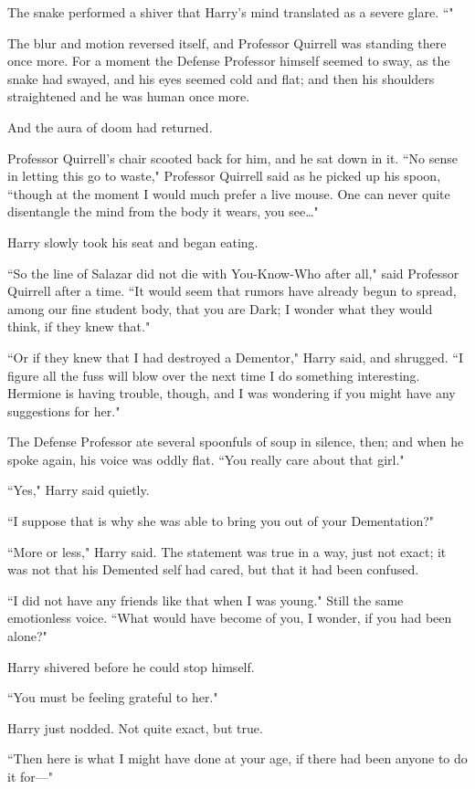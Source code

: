 The snake performed a shiver that Harry's mind translated as a severe glare. ``"

The blur and motion reversed itself, and Professor Quirrell was standing there once more. For a moment the Defense Professor himself seemed to sway, as the snake had swayed, and his eyes seemed cold and flat; and then his shoulders straightened and he was human once more.

And the aura of doom had returned.

Professor Quirrell's chair scooted back for him, and he sat down in it. ``No sense in letting this go to waste," Professor Quirrell said as he picked up his spoon, ``though at the moment I would much prefer a live mouse. One can never quite disentangle the mind from the body it wears, you see{\ldots}"

Harry slowly took his seat and began eating.

\later

``So the line of Salazar did not die with You-Know-Who after all," said Professor Quirrell after a time. ``It would seem that rumors have already begun to spread, among our fine student body, that you are Dark; I wonder what they would think, if they knew that."

``Or if they knew that I had destroyed a Dementor," Harry said, and shrugged. ``I figure all the fuss will blow over the next time I do something interesting. Hermione is having trouble, though, and I was wondering if you might have any suggestions for her."

The Defense Professor ate several spoonfuls of soup in silence, then; and when he spoke again, his voice was oddly flat. ``You really care about that girl."

``Yes," Harry said quietly.

``I suppose that is why she was able to bring you out of your Dementation?"

``More or less," Harry said. The statement was true in a way, just not exact; it was not that his Demented self had cared, but that it had been confused.

``I did not have any friends like that when I was young." Still the same emotionless voice. ``What would have become of you, I wonder, if you had been alone?"

Harry shivered before he could stop himself.

``You must be feeling grateful to her."

Harry just nodded. Not quite exact, but true.

``Then here is what I might have done at your age, if there had been anyone to do it for—"

